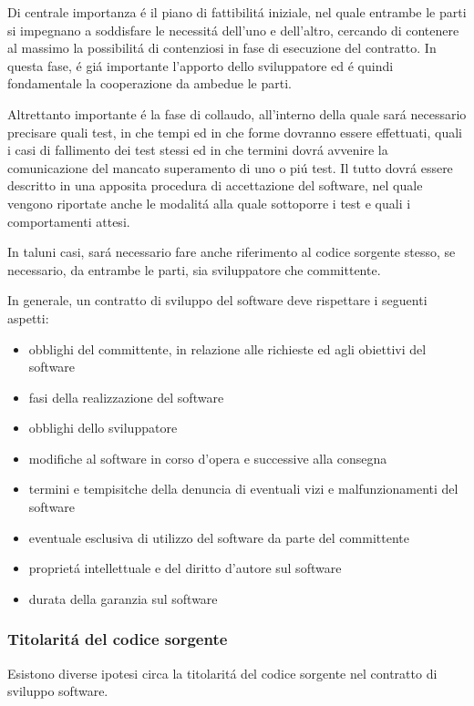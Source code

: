 \documentclass{article}
\begin{document}
Di centrale importanza \'e il piano di fattibilit\'a iniziale, nel quale entrambe le parti si impegnano a soddisfare le necessit\'a dell'uno e dell'altro, cercando di contenere al massimo la possibilit\'a di contenziosi  in fase di esecuzione del contratto. In questa fase, \'e gi\'a importante l'apporto dello sviluppatore ed \'e quindi fondamentale la cooperazione da ambedue le parti.

Altrettanto importante \'e la fase di collaudo, all'interno della quale sar\'a necessario precisare quali test, in che tempi ed in che forme dovranno essere effettuati, quali i casi di fallimento dei test stessi ed in che termini dovr\'a avvenire la comunicazione del mancato superamento di uno o pi\'u test. Il tutto dovr\'a essere descritto in una apposita procedura di accettazione del software, nel quale vengono riportate anche le modalit\'a alla quale sottoporre i test e quali i comportamenti attesi. 

In taluni casi, sar\'a necessario fare anche riferimento al codice sorgente stesso, se necessario, da entrambe le parti, sia sviluppatore che committente.

In generale, un contratto di sviluppo del software deve rispettare i seguenti aspetti: 
\begin{itemize}
    \item obblighi del committente, in relazione alle richieste ed agli obiettivi del software
    \item fasi della realizzazione del software
    \item obblighi dello sviluppatore
    \item modifiche al software in corso d'opera e successive alla consegna
    \item termini e tempisitche della denuncia di eventuali vizi e malfunzionamenti del software
    \item eventuale esclusiva di utilizzo del software da parte del committente
    \item propriet\'a intellettuale e del diritto d'autore sul software
    \item durata della garanzia sul software
\end{itemize}

\subsubsection{Titolarit\'a del codice sorgente}
Esistono diverse ipotesi circa la titolarit\'a del codice sorgente nel contratto di sviluppo software. 
\end{document}
